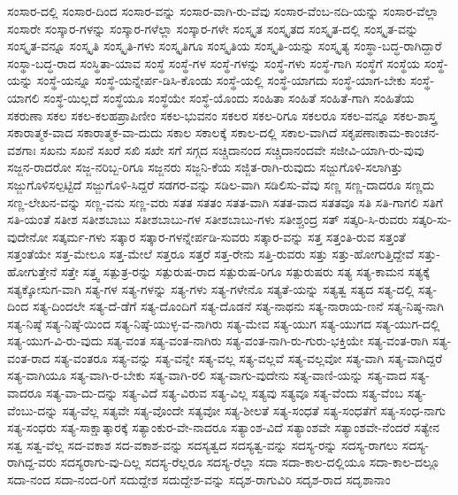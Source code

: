 {ಸಂಸಾರ-ದಲ್ಲಿ
ಸಂಸಾರ-ದಿಂದ
ಸಂಸಾರ-ವನ್ನು
ಸಂಸಾರ-ವಾಗಿ-ರು-ವೆವು
ಸಂಸಾರ-ವೆಂಬ-ನದಿ-ಯನ್ನು
ಸಂಸಾರ-ವೆಲ್ಲಾ
ಸಂಸಾರೇ
ಸಂಸ್ಕಾರ-ಗಳನ್ನು
ಸಂಸ್ಕಾರ-ಗಳೆಲ್ಲಾ
ಸಂಸ್ಕಾರ-ಗಳೇ
ಸಂಸ್ಕೃತ
ಸಂಸ್ಕೃತದ
ಸಂಸ್ಕೃತ-ದಲ್ಲಿ
ಸಂಸ್ಕೃತ-ವನ್ನು
ಸಂಸ್ಕೃತ-ವನ್ನೂ
ಸಂಸ್ಕೃತಿ
ಸಂಸ್ಕೃತಿ-ಗಳು
ಸಂಸ್ಕೃತಿಗೂ
ಸಂಸ್ಕೃತಿಯ
ಸಂಸ್ಕೃತಿ-ಯನ್ನು
ಸಂಸ್ಕೃತ್ಯ
ಸಂಸ್ಥಾ-ಬದ್ಧ-ರಾಗಿದ್ದಾರೆ
ಸಂಸ್ಥಾ-ಬದ್ಧ-ರಾದ
ಸಂಸ್ಥಿತಾ-ಯಾವ
ಸಂಸ್ಥೆ
ಸಂಸ್ಥೆ-ಗಳ
ಸಂಸ್ಥೆ-ಗಳನ್ನು
ಸಂಸ್ಥೆ-ಗಳು
ಸಂಸ್ಥೆ-ಗಾಗಿ
ಸಂಸ್ಥೆಗೆ
ಸಂಸ್ಥೆಯ
ಸಂಸ್ಥೆ-ಯನ್ನು
ಸಂಸ್ಥೆ-ಯನ್ನೂ
ಸಂಸ್ಥೆ-ಯನ್ನೇರ್ಪ-ಡಿಸಿ-ಕೊಂಡು
ಸಂಸ್ಥೆ-ಯಲ್ಲಿ
ಸಂಸ್ಥೆ-ಯಾಗದು
ಸಂಸ್ಥೆ-ಯಾಗ-ಬೇಕು
ಸಂಸ್ಥೆ-ಯಾಗಲಿ
ಸಂಸ್ಥೆ-ಯಿಲ್ಲದೆ
ಸಂಸ್ಥೆಯೂ
ಸಂಸ್ಥೆಯೇ
ಸಂಸ್ಥೆ-ಯೊಂದು
ಸಂಹಿತಾ
ಸಂಹಿತೆ
ಸಂಹಿತೆ-ಗಾಗಿ
ಸಂಹಿತೆಯ
ಸಕರುಣಾ
ಸಕಲ
ಸಕಲ-ಕಲಹಪ್ರಾಪಿಣೀಂ
ಸಕಲ-ಭುವನಂ
ಸಕಲರ
ಸಕಲ-ರಿಗೂ
ಸಕಲರೂ
ಸಕಲ-ವನ್ನೂ
ಸಕಲ-ಶಾಸ್ತ್ರ
ಸಕಾರಾತ್ಮಕ-ವಾದ
ಸಕಾರಾತ್ಮಕ-ವಾ-ದುದು
ಸಕಾಲ
ಸಕಾಲಕ್ಕೆ
ಸಕಾಲ-ದಲ್ಲಿ
ಸಕಾಲ-ವಾಗಿದೆ
ಸಕೃಪಣಾಃಕಾಮ-ಕಾಂಚನ-ವಶಗಾಃ
ಸಖನು
ಸಖನೆ
ಸಖರೆ
ಸಖಿ
ಸಖೇ
ಸಗೆ
ಸಗ್ಗದ
ಸಚ್ಚಿದಾನಂದ
ಸಚ್ಚಿದಾನಂದವೇ
ಸಜೀವಿ-ಯಾಗಿ-ರು-ವುವು
ಸಜ್ಜನ-ರಾದರೋ
ಸಜ್ಜ-ನರಿಬ್ಬ-ರಿಗೂ
ಸಜ್ಜನರು
ಸಜ್ಜನಿ-ಕೆಯ
ಸಜ್ಜಿತ-ರಾಗಿ-ರುವುದು
ಸಜ್ಜುಗೊಳಿ-ಸಲಾಗಿತ್ತು
ಸಜ್ಜುಗೊಳಿಸಲ್ಪಟ್ಟಿದೆ
ಸಜ್ಜುಗೊಳಿ-ಸಿದ್ದರೆ
ಸಡಗರ-ವನ್ನು
ಸಡಿಲ-ವಾಗಿ
ಸಡಿಲಿಸು-ವೆವು
ಸಣ್ಣ
ಸಣ್ಣ-ದಾದರೂ
ಸಣ್ಣದು
ಸಣ್ಣ-ಲೇಖನ-ವನ್ನು
ಸಣ್ಣ-ವನು
ಸಣ್ಣ-ವರು
ಸತತ
ಸತತಂ
ಸತತ-ವಾಗಿ
ಸತತ-ವಾದ
ಸತತವೂ
ಸತಿ
ಸತಿ-ಗಾಗಲಿ
ಸತಿಗೆ
ಸತಿ-ಯಂತೆ
ಸತೀಶ
ಸತೀಶಬಾಬು
ಸತೀಶಬಾಬು-ಗಳ
ಸತೀಶಬಾಬು-ಗಳು
ಸತೀಶ್ಚಂದ್ರ
ಸತ್
ಸತ್ಕರಿ-ಸಿ-ರುವರು
ಸತ್ಕರಿ-ಸು-ವುದೇನೋ
ಸತ್ಕರ್ಮ-ಗಳು
ಸತ್ಕಾರ
ಸತ್ಕಾರ-ಗಳನ್ನೇರ್ಪಡಿ-ಸುವರು
ಸತ್ಕಾರ-ವನ್ನು
ಸತ್ತ
ಸತ್ತಂತಿ-ರುವ
ಸತ್ತಂತೆ
ಸತ್ತಂತೆಯೇ
ಸತ್ತ-ಮೇಲೂ
ಸತ್ತ-ಮೇಲೆ
ಸತ್ತರೂ
ಸತ್ತರೆ
ಸತ್ತ-ರೇನು
ಸತ್ತಿ-ರುವರು
ಸತ್ತು
ಸತ್ತು-ಹೋಗುತ್ತಿದ್ದೇವೆ
ಸತ್ತು-ಹೋಗುತ್ತೇನೆ
ಸತ್ತೇ
ಸತ್ತ್ವ
ಸತ್ಪುತ್ರ-ರನ್ನು
ಸತ್ಪುರುಷ-ರಾದ
ಸತ್ಪುರುಷ-ರಿಗೂ
ಸತ್ಪುರುಷರು
ಸತ್ಯ
ಸತ್ಯ-ಕಾಮನ
ಸತ್ಯಕ್ಕೆ
ಸತ್ಯಕ್ಕೋಸುಗ-ವಾಗಿ
ಸತ್ಯ-ಗಳ
ಸತ್ಯ-ಗಳನ್ನು
ಸತ್ಯ-ಗಳು
ಸತ್ಯ-ಗಳೇನೊ
ಸತ್ಯತೆ-ಯನ್ನು
ಸತ್ಯತ್ವ
ಸತ್ಯದ
ಸತ್ಯ-ದಲ್ಲಿ
ಸತ್ಯ-ದಿಂದ
ಸತ್ಯ-ದಿಂದಲೇ
ಸತ್ಯ-ದೆ-ಡೆಗೆ
ಸತ್ಯ-ದೊಂದಿಗೆ
ಸತ್ಯ-ದೊಡನೆ
ಸತ್ಯ-ನಾಥನು
ಸತ್ಯ-ನಾರಾಯ-ಣನೆ
ಸತ್ಯ-ನಿಷ್ಠ-ನಾಗಿ
ಸತ್ಯ-ನಿಷ್ಠೆ
ಸತ್ಯ-ನಿಷ್ಠೆ-ಯಿಂದ
ಸತ್ಯ-ನಿಷ್ಠೆ-ಯುಳ್ಳ-ವ-ನಾಗಿರು
ಸತ್ಯ-ಮೇವ
ಸತ್ಯ-ಯುಗ
ಸತ್ಯ-ಯುಗದ
ಸತ್ಯ-ಯುಗ-ದಲ್ಲಿ
ಸತ್ಯ-ಯುಗ-ವಿ-ರು-ವುದು
ಸತ್ಯ-ವಂತ
ಸತ್ಯ-ವಂತ-ನಾಗಿರು
ಸತ್ಯ-ವಂತ-ನಾಗಿ-ರು-ಗುರು-ಭಕ್ತಿಯೇ
ಸತ್ಯ-ವಂತ-ರಾಗಿ
ಸತ್ಯ-ವಂತ-ರಾದ
ಸತ್ಯ-ವಂತರೂ
ಸತ್ಯ-ವನ್ನು
ಸತ್ಯ-ವನ್ನೇ
ಸತ್ಯ-ವಲ್ಲ
ಸತ್ಯ-ವಲ್ಲವೆ
ಸತ್ಯ-ವಲ್ಲವೋ
ಸತ್ಯ-ವಾಗಿ
ಸತ್ಯ-ವಾಗಿದ್ದರೆ
ಸತ್ಯ-ವಾಗಿಯೂ
ಸತ್ಯ-ವಾಗಿ-ರ-ಬೇಕು
ಸತ್ಯ-ವಾಗಿ-ರಲಿ
ಸತ್ಯ-ವಾಗು-ವುದೇನು
ಸತ್ಯ-ವಾಣಿ-ಯನ್ನು
ಸತ್ಯ-ವಾದ
ಸತ್ಯ-ವಾದರೂ
ಸತ್ಯ-ವಾ-ದು-ದನ್ನು
ಸತ್ಯ-ವಿದೆ
ಸತ್ಯ-ವಿರುವ
ಸತ್ಯ-ವಿಲ್ಲ
ಸತ್ಯವು
ಸತ್ಯವೂ
ಸತ್ಯ-ವೆಂದು
ಸತ್ಯ-ವೆಂಬ
ಸತ್ಯ-ವೆಂಬು-ದನ್ನು
ಸತ್ಯ-ವೆಲ್ಲ
ಸತ್ಯವೇ
ಸತ್ಯ-ವೊಂದೇ
ಸತ್ಯವೋ
ಸತ್ಯ-ಶೀಲತೆ
ಸತ್ಯ-ಸಂಧತೆ
ಸತ್ಯ-ಸಂಧತೆಗೆ
ಸತ್ಯ-ಸಂಧ-ನಾಗು
ಸತ್ಯ-ಸಂಧರು
ಸತ್ಯ-ಸಾಕ್ಷಾತ್ಕಾರಕ್ಕೆ
ಸತ್ಯಾಂಕುರ-ವೇ-ನಾದರೂ
ಸತ್ಯಾಂಶ-ವಿದೆ
ಸತ್ಯಾಂಶವೇ
ಸತ್ಯಾಂಶವೇ-ನೆಂದರೆ
ಸತ್ಯೇನ
ಸತ್ವ
ಸತ್ವ-ವೆಲ್ಲ
ಸದ-ವಕಾಶ
ಸದ-ವಕಾಶ-ವನ್ನು
ಸದಸ್ಯತ್ವದ
ಸದಸ್ಯತ್ವ-ವನ್ನು
ಸದಸ್ಯ-ರನ್ನು
ಸದಸ್ಯ-ರಾಗಲು
ಸದಸ್ಯ-ರಾಗಿದ್ದ-ವರು
ಸದಸ್ಯರಾಗು-ವು-ದಿಲ್ಲ
ಸದಸ್ಯ-ರೆಲ್ಲರೂ
ಸದಸ್ಯ-ರೆಲ್ಲಾ
ಸದಾ
ಸದಾ-ಕಾಲ-ದಲ್ಲಿಯೂ
ಸದಾ-ಕಾಲ-ದಲ್ಲೂ
ಸದಾ-ನಂದ
ಸದಾ-ನಂದ-ರಿಗೆ
ಸದುದ್ದೇಶ
ಸದುದ್ದೇಶ-ವನ್ನು
ಸದೃಶ-ರಾಗುವಿರಿ
ಸದೃಶ-ರಾದ
ಸದೃಶಾನಾಂ
}
